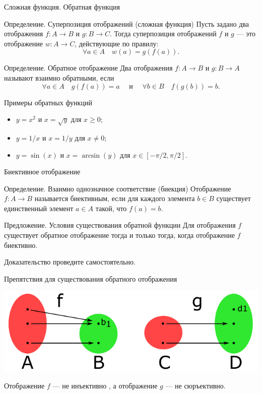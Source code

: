 \documentclass[8pt]{beamer}
\begin{document}
\begin{frame}{Сложная функция. Обратная функция}
\begin{block}{Определение. Суперпозиция отображений (сложная функция)}
Пусть задано два отображения  $f: A \rightarrow B$ и  $g: B \rightarrow C$. Тогда суперпозиция отображений  $f$ и $g$ --- это отображение $w: A \rightarrow C$, действующие по правилу:
$$\forall a \in A \quad w(a) = g(f(a)).$$
\end{block}
\pause
\begin{block}{Определение. Обратное отображение}
Два отображения  $f: A \rightarrow B$ и  $g: B \rightarrow A$ называют взаимно обратными, если
$$\forall a \in A \quad  g(f(a))=a 
\quad\text{ и }\quad 
\forall b \in B \quad  f(g(b))=b.$$
\end{block}
\pause
\begin{block}{Примеры обратных функций}
\begin{itemize}
\item $y=x^2$ и $x=\sqrt{y}$ для $x\ge 0$;
\item $y=1/x$ и $x=1/y$ для $x\ne 0$;
\item $y=\sin(x)$ и $x=\arcsin(y)$ для $x\in [-\pi/2, \pi/2 ]$.
\end{itemize}
\end{block}
\end{frame}

\begin{frame}{Биективное отображение}
\begin{block}{Определение. Взаимно однозначное соответствие (биекция)}
Отображение  $f: A \rightarrow B$ называется биективным, если для каждого элемента $b\in B$ существует единственный элемент $a\in A$ такой, что $f(a)=b$.
\end{block}

\begin{block}{Предложение. Условия существования обратной функции}
Для отображения $f$ существует обратное отображение тогда и только тогда, когда отображение $f$ биективно.
\end{block}
Доказательство проведите самостоятельно.

\begin{block}{Препятствия для существования обратного отображения}

\begin{center}
\includegraphics[scale=0.7]{set1.pdf}
\end{center}
Отображение $f$ --- не инъективно , а отображение $g$ --- не сюръективно.
\end{block}
\end{frame}
\end{document}
